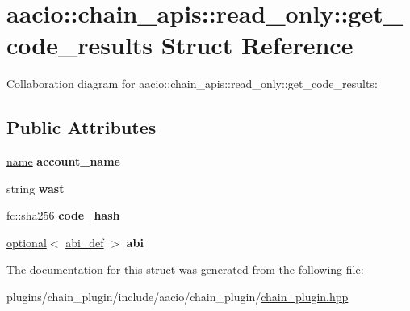 \hypertarget{structaacio_1_1chain__apis_1_1read__only_1_1get__code__results}{}\section{aacio\+:\+:chain\+\_\+apis\+:\+:read\+\_\+only\+:\+:get\+\_\+code\+\_\+results Struct Reference}
\label{structaacio_1_1chain__apis_1_1read__only_1_1get__code__results}


Collaboration diagram for aacio\+:\+:chain\+\_\+apis\+:\+:read\+\_\+only\+:\+:get\+\_\+code\+\_\+results\+:
\subsection*{Public Attributes}
\begin{DoxyCompactItemize}
\item 
\mbox{\label{structaacio_1_1chain__apis_1_1read__only_1_1get__code__results_a92c4a74962231d2862d9ae5f80c5e7d6}} 
\mbox{\hyperlink{structaacio_1_1name}{name}} {\bfseries account\+\_\+name}
\item 
\mbox{\label{structaacio_1_1chain__apis_1_1read__only_1_1get__code__results_a6c7d6f8fba009ff99bcbea314239ff04}} 
string {\bfseries wast}
\item 
\mbox{\label{structaacio_1_1chain__apis_1_1read__only_1_1get__code__results_aa551659725fc2eb14a6e02632a3f90bd}} 
\mbox{\hyperlink{classfc_1_1sha256}{fc\+::sha256}} {\bfseries code\+\_\+hash}
\item 
\mbox{\label{structaacio_1_1chain__apis_1_1read__only_1_1get__code__results_a65f76d89e2ca173bf31400a7ff88e68e}} 
\mbox{\hyperlink{classaacio_1_1optional}{optional}}$<$ \mbox{\hyperlink{structaacio_1_1chain_1_1contracts_1_1abi__def}{abi\+\_\+def}} $>$ {\bfseries abi}
\end{DoxyCompactItemize}


The documentation for this struct was generated from the following file\+:\begin{DoxyCompactItemize}
\item 
plugins/chain\+\_\+plugin/include/aacio/chain\+\_\+plugin/\mbox{\hyperlink{chain__plugin_8hpp}{chain\+\_\+plugin.\+hpp}}\end{DoxyCompactItemize}
